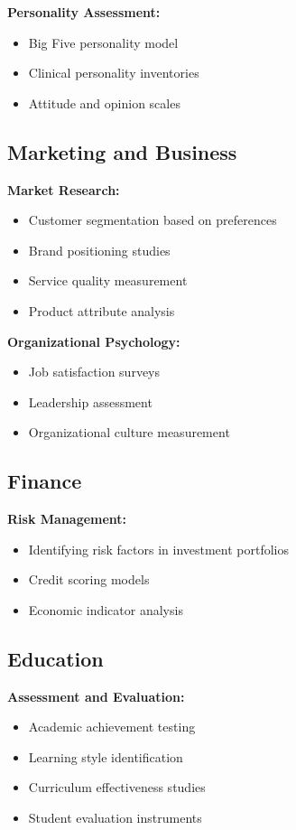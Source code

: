 \documentclass[a4paper]{tufte-book}
\begin{document}
\textbf{Personality Assessment:}
\begin{itemize}
\item Big Five personality model
\item Clinical personality inventories
\item Attitude and opinion scales
\end{itemize}

\subsection{Marketing and Business}

\textbf{Market Research:}
\begin{itemize}
\item Customer segmentation based on preferences
\item Brand positioning studies
\item Service quality measurement
\item Product attribute analysis
\end{itemize}

\textbf{Organizational Psychology:}
\begin{itemize}
\item Job satisfaction surveys
\item Leadership assessment
\item Organizational culture measurement
\end{itemize}

\subsection{Finance}

\textbf{Risk Management:}
\begin{itemize}
\item Identifying risk factors in investment portfolios
\item Credit scoring models
\item Economic indicator analysis
\end{itemize}

\subsection{Education}

\textbf{Assessment and Evaluation:}
\begin{itemize}
\item Academic achievement testing
\item Learning style identification
\item Curriculum effectiveness studies
\item Student evaluation instruments
\end{itemize}
\end{document}
